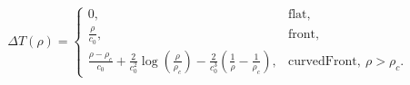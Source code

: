 $$
\Delta T(\rho) = \begin{cases}
0, & \text{flat},\\
\frac{\rho}{c_0}, & \text{front},\\
\frac{\rho - \rho_c}{c_0} + \frac{2}{c_0^{2}} \log{\left(\frac{\rho}{\rho_c} \right)} - \frac{2}{c_0^{3}} \left(\frac{1}{\rho} - \frac{1}{\rho_c}\right), & \text{curvedFront},\ \rho>\rho_c.
\end{cases}
$$
